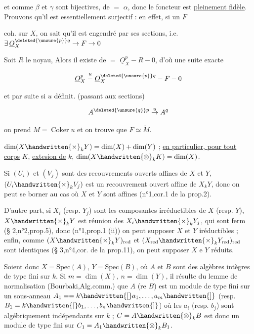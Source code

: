 et comme $\beta$ et $\gamma$ sont bijectives, de $=$ $\alpha$, donc le foncteur  est \uline{pleinement fidèle}. Prouvons qu'il est essentiellement surjectif : en effet, si un $F$

coh. sur $X$, on sait qu'il est engendré par ses sections, i.e. $\exists\,\underline O_X^{\deleted{\unsure{p}}q}\to F\to0$  

Soit $R$ le noyau, Alors il existe de $=$ $\underline O_X^p - R - 0$, d'où une suite exacte

\[
 \underline O_X^{p}\mathrel{\overset{u}{-}}\underline O_X^{\deleted{\unsure{p}}q} - F - 0
\]

et par suite   si $u$ définit. (passant aux sections)

\[
 A^{\deleted{\unsure{q}}p}\mathrel{\overset{u}{\to}}A^q
\]

on prend $M=\operatorname{Coker}u$ et on trouve que $F\simeq\widetilde M$.

$\dim(X\handwritten{\times}_k Y)=\dim(X)+\dim(Y)$ ; \uline{en particulier, pour tout corps} $K$, \uline{extesion de} $k$, $\dim(X\handwritten{\otimes}_k K)=\dim(X)$.

Si $(U_i)$ et $(V_j)$ sont des recouvrements ouverts affines de $X$ et $Y$, $(U_i\handwritten{\times}_k V_j)$ est un recouvrement ouvert affine de $X{}_kY$, donc on peut se borner au cas où $X$ et $Y$ sont affines (n°1,cor.1 de la prop.2).

D'autre part, si  $X_i$ (resp. $Y_j$) sont les composantes irréductibles de $X$ (resp. $Y$), $X\handwritten{\times}_kY$ est réunion des $X_i\handwritten{\times}_kY_j$, qui sont ferm (\S{} 2,n°2,prop.5), donc (n°1,prop.1 (ii)) on peut supposer $X$ et $Y$ iréductibles ;  enfin, comme $(X\handwritten{\times}_kY)_{\mathrm{red}}$ et $(X_{\mathrm{red}}\handwritten{\times}_kY_{\mathrm{red}})_{\mathrm{red}}$ sont identiques (\S{} 3,n°4,cor. de la prop.11), on peut supposer $X$ e $Y$ réduits.

Soient donc $X=\mathrm{Spec}(A)$, $Y=\mathrm{Spec}(B)$, où $A$ et $B$ sont des algèbres intègres de type fini sur $k$. Si $m=\dim(X)$, $n=\dim(Y)$, il résulte du lemme de normalisation (Bourbaki,Alg.comm.\qquad) que $A$ (re $B$) est  un module de type fini sur un sous-anneau $A_1=\allowbreak =k\handwritten{[}a_1,\dots,a_m\handwritten{]}$ (resp. $B_1=k\handwritten{[}b_1,\dots,b_n\handwritten{]}$) où les $a_i$ (resp. $b_j$) sont algébriquement indépendants sur $k$ ; $C=A\handwritten{\otimes}_kB$ est donc un module de type fini sur $C_1=A_1\handwritten{\otimes}_kB_1$.

